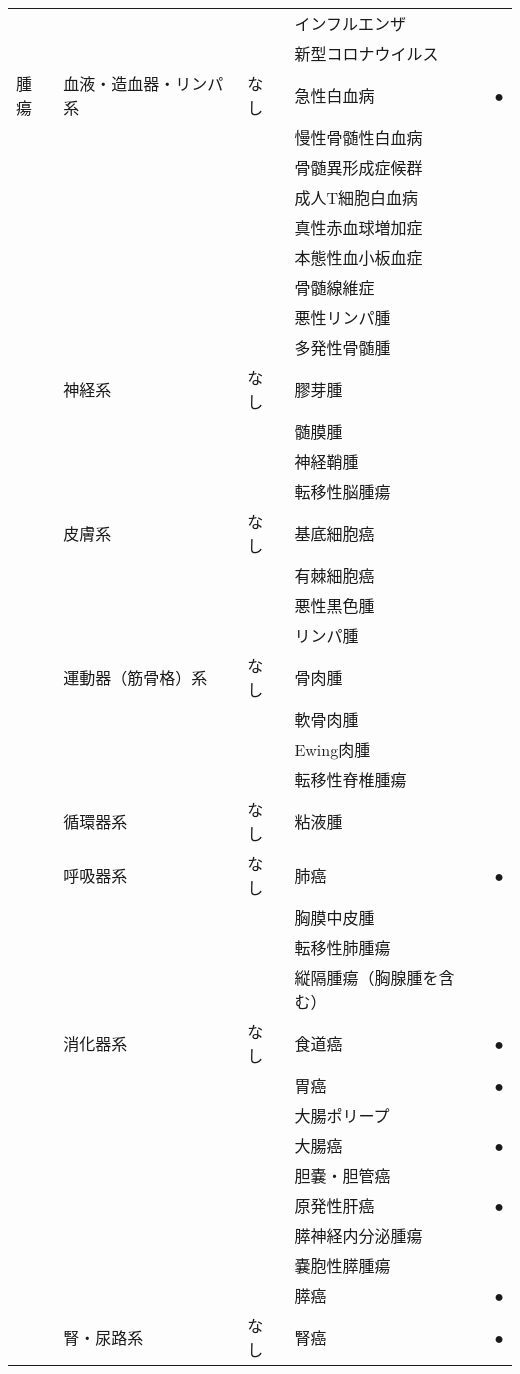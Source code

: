 \begin{xltabular}{\linewidth}{XXXXX}
 &  &  & インフルエンザ &  \\
 &  &  & 新型コロナウイルス &  \\
腫瘍 & 血液・造血器・リンパ系 & なし & 急性白血病 & ● \\
 &  &  & 慢性骨髄性白血病 &  \\
 &  &  & 骨髄異形成症候群 &  \\
 &  &  & 成人T細胞白血病 &  \\
 &  &  & 真性赤血球増加症 &  \\
 &  &  & 本態性血小板血症 &  \\
 &  &  & 骨髄線維症 &  \\
 &  &  & 悪性リンパ腫 &  \\
 &  &  & 多発性骨髄腫 &  \\
 & 神経系 & なし & 膠芽腫 &  \\
 &  &  & 髄膜腫 &  \\
 &  &  & 神経鞘腫 &  \\
 &  &  & 転移性脳腫瘍 &  \\
 & 皮膚系 & なし & 基底細胞癌 &  \\
 &  &  & 有棘細胞癌 &  \\
 &  &  & 悪性黒色腫 &  \\
 &  &  & リンパ腫 &  \\
 & 運動器（筋骨格）系 & なし & 骨肉腫 &  \\
 &  &  & 軟骨肉腫 &  \\
 &  &  & Ewing肉腫 &  \\
 &  &  & 転移性脊椎腫瘍 &  \\
 & 循環器系 & なし & 粘液腫 &  \\
 & 呼吸器系 & なし & 肺癌 & ● \\
 &  &  & 胸膜中皮腫 &  \\
 &  &  & 転移性肺腫瘍 &  \\
 &  &  & 縦隔腫瘍（胸腺腫を含む） &  \\
 & 消化器系 & なし & 食道癌 & ● \\
 &  &  & 胃癌 & ● \\
 &  &  & 大腸ポリープ &  \\
 &  &  & 大腸癌 & ● \\
 &  &  & 胆嚢・胆管癌 &  \\
 &  &  & 原発性肝癌 & ● \\
 &  &  & 膵神経内分泌腫瘍 &  \\
 &  &  & 嚢胞性膵腫瘍 &  \\
 &  &  & 膵癌 & ● \\
 & 腎・尿路系 & なし & 腎癌 & ● \\

\end{xltabular}
